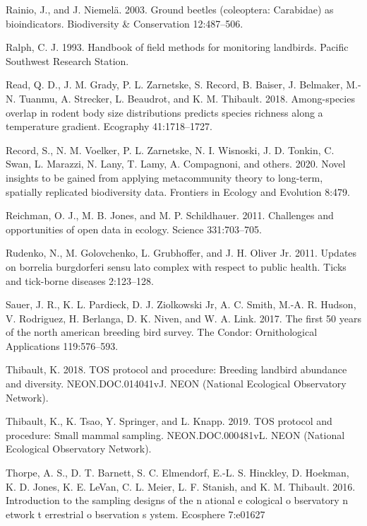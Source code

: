 \documentclass[
  12pt,
]{article}
\newlength{\cslhangindent}
\newenvironment{cslreferences}%
  {\setlength{\parindent}{0pt}%
  \everypar{\setlength{\hangindent}{\cslhangindent}}\ignorespaces}%
  {\par}
\providecommand{\DIFaddtex}[1]{{\protect\color{blue}\uwave{#1}}} %
\providecommand{\DIFaddbegin}{} %
\providecommand{\DIFaddend}{} %
\providecommand{\DIFadd}[1]{\texorpdfstring{\DIFaddtex{#1}}{#1}} %
\newcommand{\DIFaddincludegraphics}[2][]{{\color{blue}\fbox{\DIFOincludegraphics[#1]{#2}}}} %
\DeclareRobustCommand{\DIFaddbegin}{\DIFOaddbegin \let\includegraphics\DIFaddincludegraphics} %
\DeclareRobustCommand{\DIFaddend}{\DIFOaddend \let\includegraphics\DIFOincludegraphics} %
\begin{document}
\begin{cslreferences}
\leavevmode\DIFaddend \hypertarget{ref-rainio2003ground}{}%
Rainio, J., and J. Niemelä. 2003. Ground beetles (coleoptera: Carabidae) as bioindicators. Biodiversity \& Conservation 12:487--506.

\leavevmode\hypertarget{ref-ralph1993handbook}{}%
Ralph, C. J. 1993. Handbook of field methods for monitoring landbirds. Pacific Southwest Research Station.

\leavevmode\hypertarget{ref-read2018among}{}%
Read, Q. D., J. M. Grady, P. L. Zarnetske, S. Record, B. Baiser, J. Belmaker, M.-N. Tuanmu, A. Strecker, L. Beaudrot, and K. M. Thibault. 2018. Among-species overlap in rodent body size distributions predicts species richness along a temperature gradient. Ecography 41:1718--1727.

\leavevmode\hypertarget{ref-record2020novel}{}%
Record, S., N. M. Voelker, P. L. Zarnetske, N. I. Wisnoski, J. D. Tonkin, C. Swan, L. Marazzi, N. Lany, T. Lamy, A. Compagnoni, and others. 2020. Novel insights to be gained from applying metacommunity theory to long-term, spatially replicated biodiversity data. Frontiers in Ecology and Evolution 8:479.

\leavevmode\hypertarget{ref-reichman2011challenges}{}%
Reichman, O. J., M. B. Jones, and M. P. Schildhauer. 2011. Challenges and opportunities of open data in ecology. Science 331:703--705.

\leavevmode\hypertarget{ref-rudenko2011updates}{}%
Rudenko, N., M. Golovchenko, L. Grubhoffer, and J. H. Oliver Jr. 2011. Updates on borrelia burgdorferi sensu lato complex with respect to public health. Ticks and tick-borne diseases 2:123--128.

\leavevmode\hypertarget{ref-sauer2017first}{}%
Sauer, J. R., K. L. Pardieck, D. J. Ziolkowski Jr, A. C. Smith, M.-A. R. Hudson, V. Rodriguez, H. Berlanga, D. K. Niven, and W. A. Link. 2017. The first 50 years of the north american breeding bird survey. The Condor: Ornithological Applications 119:576--593.

\leavevmode\hypertarget{ref-thibault2018TOS}{}%
Thibault, K. 2018. TOS protocol and procedure: Breeding landbird abundance and diversity. NEON.DOC.014041vJ. NEON (National Ecological Observatory Network).

\leavevmode\hypertarget{ref-thibault2019TOS}{}%
Thibault, K., K. Tsao, Y. Springer, and L. Knapp. 2019. TOS protocol and procedure: Small mammal sampling. NEON.DOC.000481vL. NEON (National Ecological Observatory Network).

\leavevmode\hypertarget{ref-thorpe2016introduction}{}%
Thorpe, A. S., D. T. Barnett, S. C. Elmendorf, E.-L. S. Hinckley, D. Hoekman, K. D. Jones, K. E. LeVan, C. L. Meier, L. F. Stanish, and K. M. Thibault. 2016. Introduction to the sampling designs of the n ational e cological o bservatory n etwork t errestrial o bservation s ystem. Ecosphere 7:e01627\DIFaddbegin \DIFadd{.
}


\end{cslreferences}
\end{document}

